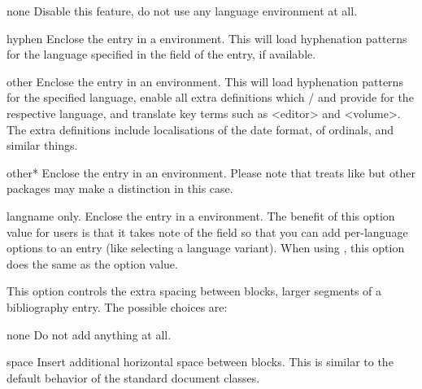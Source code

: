 \documentclass{ltxdockit}[2011/03/25]
\newcommand*{\biblatex}{\sty{biblatex}\xspace}
\begin{document}
\begin{optionlist}
\begin{valuelist}

\item[none]
Disable this feature, \ie do not use any language environment at all.

\item[hyphen]
Enclose the entry in a  environment. This will load hyphenation patterns for the language specified in the  field of the entry, if available.

\item[other]
Enclose the entry in an  environment. This will load hyphenation patterns for the specified language, enable all extra definitions which / and \biblatex provide for the respective language, and translate key terms such as <editor> and <volume>. The extra definitions include localisations of the date format, of ordinals, and similar things.

\item[other*]
Enclose the entry in an  environment. Please note that \biblatex treats  like  but other packages may make a distinction in this case.

\item[langname]
 only. Enclose the entry in a  environment. The benefit of this option value for  users is that it takes note of the  field so that you can add per-language options to an entry (like selecting a language variant). When using , this option does the same as the  option value.

\end{valuelist}


This option controls the extra spacing between blocks, \ie larger segments of a bibliography entry. The possible choices are:

\begin{valuelist}

\item[none] Do not add anything at all.

\item[space] Insert additional horizontal space between blocks. This is similar to the default behavior of the standard \latex document classes.


\end{valuelist}
\end{optionlist}
\end{document}
